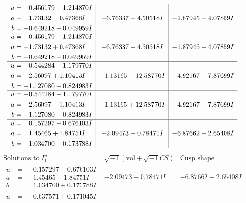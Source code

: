 \documentclass[1p]{elsarticle_modified}
\theoremstyle{definition}
\newcommand{\I}{\sqrt{-1}}
\begin{document}
$$\begin{array}{c|c|c}
\begin{aligned}
u &= \phantom{-}0.456179 + 1.214870 I \\
a &= -1.73132 - 0.47368 I \\
b &= -0.649218 + 0.049959 I\end{aligned}
 & -6.76337 + 4.50518 I & -1.87945 - 4.07859 I \\ \hline\begin{aligned}
u &= \phantom{-}0.456179 - 1.214870 I \\
a &= -1.73132 + 0.47368 I \\
b &= -0.649218 - 0.049959 I\end{aligned}
 & -6.76337 - 4.50518 I & -1.87945 + 4.07859 I \\ \hline\begin{aligned}
u &= -0.544284 + 1.179770 I \\
a &= -2.56097 + 1.10413 I \\
b &= -1.127080 - 0.824983 I\end{aligned}
 & \phantom{-}1.13195 - 12.58770 I & -4.92167 + 7.87699 I \\ \hline\begin{aligned}
u &= -0.544284 - 1.179770 I \\
a &= -2.56097 - 1.10413 I \\
b &= -1.127080 + 0.824983 I\end{aligned}
 & \phantom{-}1.13195 + 12.58770 I & -4.92167 - 7.87699 I \\ \hline\begin{aligned}
u &= \phantom{-}0.157297 + 0.676103 I \\
a &= \phantom{-}1.45465 + 1.84751 I \\
b &= \phantom{-}1.034700 - 0.173788 I\end{aligned}
 & -2.09473 + 0.78471 I & -6.87662 + 2.65408 I\\
 \hline 
 \end{array}$$\newpage$$\begin{array}{c|c|c}  
\text{Solutions to }I^u_{1}& \I (\text{vol} + \sqrt{-1}CS) & \text{Cusp shape}\\
 \hline 
\begin{aligned}
u &= \phantom{-}0.157297 - 0.676103 I \\
a &= \phantom{-}1.45465 - 1.84751 I \\
b &= \phantom{-}1.034700 + 0.173788 I\end{aligned}
 & -2.09473 - 0.78471 I & -6.87662 - 2.65408 I \\ \hline\begin{aligned}
u &= \phantom{-}0.637571 + 0.171045 I \\

\end{aligned}
\end{array}$$
\end{document}
